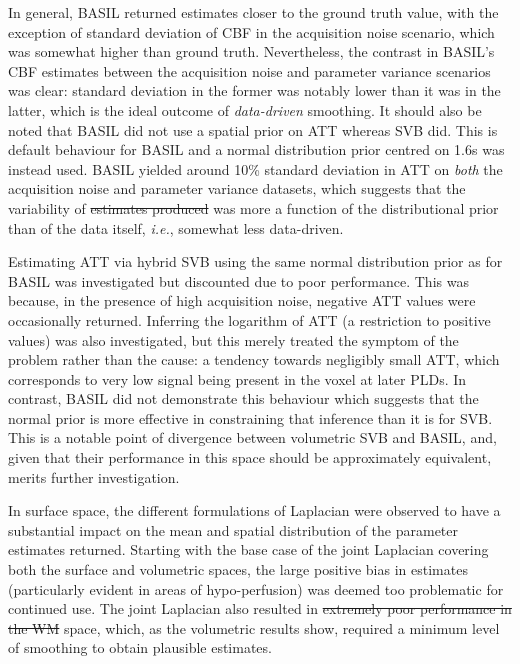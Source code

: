\documentclass[12pt]{report}
\providecommand{\DIFaddtex}[1]{{\protect\color{blue}\uwave{#1}}} %
\providecommand{\DIFdeltex}[1]{{\protect\color{red}\sout{#1}}}                      %
\providecommand{\DIFaddbegin}{} %
\providecommand{\DIFaddend}{} %
\providecommand{\DIFdelbegin}{} %
\providecommand{\DIFdelend}{} %
\providecommand{\DIFadd}[1]{\texorpdfstring{\DIFaddtex{#1}}{#1}} %
\providecommand{\DIFdel}[1]{\texorpdfstring{\DIFdeltex{#1}}{}} %
\newcommand{\DIFscaledelfig}{0.5}
\newlength{\DIFdelgraphicswidth} %
\newlength{\DIFdelgraphicsheight} %
\newcommand{\DIFaddincludegraphics}[2][]{{\color{blue}\fbox{\DIFOincludegraphics[#1]{#2}}}} %
\newcommand{\DIFdelincludegraphics}[2][]{%
\sbox{\DIFdelgraphicsbox}{\DIFOincludegraphics[#1]{#2}}%
\settoboxwidth{\DIFdelgraphicswidth}{\DIFdelgraphicsbox} %
\settoboxtotalheight{\DIFdelgraphicsheight}{\DIFdelgraphicsbox} %
\scalebox{\DIFscaledelfig}{%
\parbox[b]{\DIFdelgraphicswidth}{\usebox{\DIFdelgraphicsbox}\\[-\baselineskip] \rule{\DIFdelgraphicswidth}{0em}}\llap{\resizebox{\DIFdelgraphicswidth}{\DIFdelgraphicsheight}{%
\setlength{\unitlength}{\DIFdelgraphicswidth}%
\begin{picture}(1,1)%
\thicklines\linethickness{2pt} %
{\color[rgb]{1,0,0}\put(0,0){\framebox(1,1){}}}%
{\color[rgb]{1,0,0}\put(0,0){\line( 1,1){1}}}%
{\color[rgb]{1,0,0}\put(0,1){\line(1,-1){1}}}%
\end{picture}%
}\hspace*{3pt}}} %
} %
\DeclareRobustCommand{\DIFaddbegin}{\DIFOaddbegin \let\includegraphics\DIFaddincludegraphics} %
\DeclareRobustCommand{\DIFaddend}{\DIFOaddend \let\includegraphics\DIFOincludegraphics} %
\DeclareRobustCommand{\DIFdelbegin}{\DIFOdelbegin \let\includegraphics\DIFdelincludegraphics} %
\DeclareRobustCommand{\DIFdelend}{\DIFOaddend \let\includegraphics\DIFOincludegraphics} %
\begin{document}
In general, BASIL returned estimates closer to the ground truth value, with the exception of standard deviation of CBF in the acquisition noise scenario, which was somewhat higher than ground truth. Nevertheless, the contrast in BASIL's CBF estimates between the acquisition noise and parameter variance scenarios was clear: standard deviation in the former was notably lower than it was in the latter, which is the ideal outcome of \textit{data-driven} smoothing. It should also be noted that BASIL did not use a spatial prior on ATT whereas SVB did. This is default behaviour for BASIL and a normal distribution prior centred on 1.6s was instead used. BASIL yielded around 10\% standard deviation in ATT on \textit{both} the acquisition noise and parameter variance datasets, which suggests that the variability of \DIFdelbegin \DIFdel{estimates produced }\DIFdelend \DIFaddbegin \DIFadd{ATT estimates }\DIFaddend was more a function of the distributional prior than of the data itself, \textit{i.e.}, somewhat less data-driven. 

Estimating ATT via hybrid SVB using the same normal distribution prior as for BASIL was investigated but discounted due to poor performance. This was because, in the presence of high acquisition noise, negative ATT values were occasionally returned. Inferring the logarithm of ATT (a restriction to positive values) was also investigated, but this merely treated the symptom of the problem rather than the cause: a tendency towards negligibly small ATT, which corresponds to very low signal being present in the voxel at later PLDs. In contrast, BASIL did not demonstrate this behaviour which suggests that the normal prior is more effective in constraining that inference than it is for SVB. This is a notable point of divergence between volumetric SVB and BASIL, and, given that their performance in this space should be approximately equivalent, merits further investigation. 

In surface space, the different formulations of Laplacian were observed to have a substantial impact on the mean and spatial distribution of the parameter estimates returned. Starting with the base case of the joint Laplacian covering both the surface and volumetric spaces, the large positive bias in estimates (particularly evident in areas of hypo-perfusion) was deemed too problematic for continued use. The joint Laplacian also resulted in \DIFdelbegin \DIFdel{extremely poor performance in the WM }\DIFdelend \DIFaddbegin \DIFadd{poor performance for WM in the volume }\DIFaddend space, which, as the volumetric results show, required a minimum level of smoothing to obtain plausible estimates. 
\end{document}
